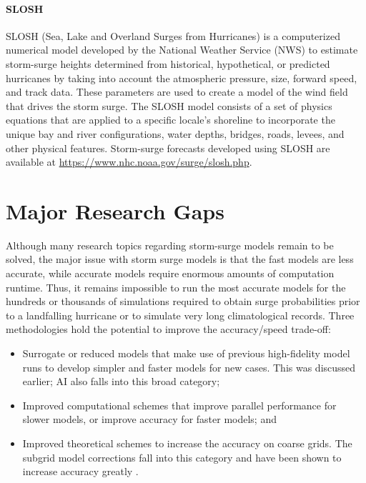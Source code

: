\paragraph{SLOSH} SLOSH (Sea, Lake and Overland Surges from Hurricanes) is a computerized numerical model developed by the National Weather Service (NWS) to estimate storm-surge heights determined from historical, hypothetical, or predicted hurricanes by taking into account the atmospheric pressure, size, forward speed, and track data. These parameters are used to create a model of the wind field that drives the storm surge. The SLOSH model consists of a set of physics equations that are applied to a specific locale's shoreline to incorporate the unique bay and river configurations, water depths, bridges, roads, levees, and other physical features. Storm-surge forecasts developed using SLOSH are available at \url{https://www.nhc.noaa.gov/surge/slosh.php}.

\section{Major Research Gaps}
\label{sec:storm_surge_gaps}

Although many research topics regarding storm-surge models remain to be solved, the major issue with storm surge models is that the fast models are less accurate, while accurate models require enormous amounts of computation runtime. Thus, it remains impossible to run the most accurate models for the hundreds or thousands of simulations required to obtain surge probabilities prior to a landfalling hurricane or to simulate very long climatological records. Three methodologies hold the potential to improve the accuracy/speed trade-off:

\begin{itemize}
    \item Surrogate or reduced models that make use of previous high-fidelity model runs to develop simpler and faster models for new cases. This was discussed earlier; AI also falls into this broad category;
        \vspace{2mm}
    \item Improved computational schemes that improve parallel performance for slower models, or improve accuracy for faster models; and
        \vspace{2mm}
    \item Improved theoretical schemes to increase the accuracy on coarse grids. The subgrid model corrections fall into this category and have been shown to increase accuracy greatly \citep{kennedy2019subgrid}.
\end{itemize}

